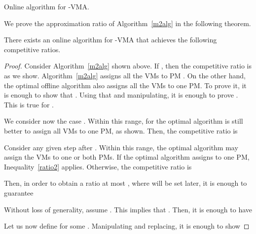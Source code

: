 \begin{algorithm}
\caption{Online algorithm for -VMA.}
\label{m2alg}
\end{algorithm}

We prove the approximation ratio of Algorithm~\ref{m2alg} in the following theorem.

\begin{theorem}
\label{theo:UB2PMs}
There exists an online algorithm for -VMA that achieves the following competitive ratios.

\end{theorem}

\begin{proof}
Consider Algorithm~\ref{m2alg} shown above.
If , then the competitive ratio is  as we show. Algorithm~\ref{m2alg} assigns all the VMs to PM . On the other hand, the optimal offline algorithm also assigns all the VMs to one PM. To prove it, it is enough to show that
. Using that  and manipulating, it is enough to prove
.
This is true for .



We consider now the case . Within this range, for the optimal algorithm is still better to assign all VMs to one PM, as shown. Then, the competitive ratio  is




Consider any given step after .
Within this range, the optimal algorithm may assign the VMs to one or both PMs.
If the optimal algorithm assigns to one PM, Inequality~\ref{ratio2} applies.
Otherwise, the competitive ratio  is

Then, in order to obtain a ratio at most , where  will be set later, it is enough to guarantee

Without loss of generality, assume . This implies that .
Then, it is enough to have

Let us now define  for some . Manipulating and replacing, it is enough to show




\end{proof}
